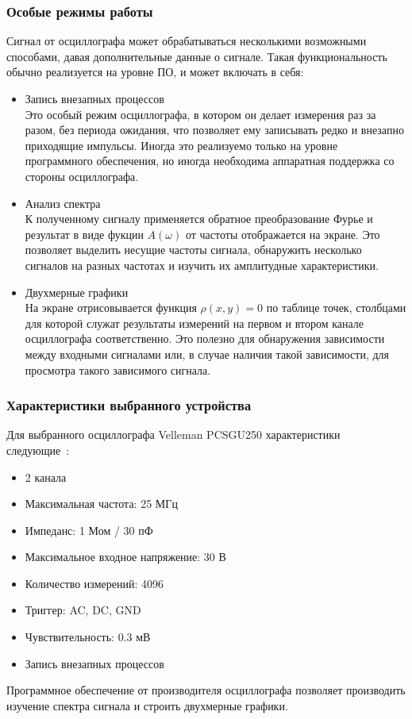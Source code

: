 \documentclass[a4paper,12pt]{report}
\numberwithin{equation}{section}
\begin{document}
\subsubsection{Особые режимы работы}
Сигнал от осциллографа может обрабатываться несколькими возможными способами,
давая дополнительные данные о сигнале. Такая функциональность обычно реализуется
на уровне ПО, и может включать в себя:
\begin{itemize}
\item Запись внезапных процессов \\
Это особый режим осциллографа, в котором он делает измерения раз за разом, без
периода ожидания, что позволяет ему записывать редко и внезапно приходящие
импульсы. Иногда это реализуемо только на уровне программного обеспечения, но
иногда необходима аппаратная поддержка со стороны осциллографа.
\item Анализ спектра \\
К полученному сигналу применяется обратное преобразование Фурье и результат
в виде фукции $A(\omega)$ от частоты отображается на экране. Это позволяет
выделить несущие частоты сигнала, обнаружить несколько сигналов на разных
частотах и изучить их амплитудные характеристики.
\item Двухмерные графики \\
На экране отрисовывается функция $\rho(x, y)=0$ по таблице точек, столбцами для
которой служат результаты измерений на первом и втором канале осциллографа
соответственно. Это полезно для обнаружения зависимости между входными сигналами
или, в случае наличия такой зависимости, для просмотра такого зависимого
сигнала.
\end{itemize}

\subsubsection{Характеристики выбранного устройства}
Для выбранного осциллографа Velleman PCSGU250 характеристики
следующие~\cite{vellemaninfo}:
\begin{itemize}
\item 2 канала
\item Максимальная частота: 25 МГц
\item Импеданс: 1 Мом / 30 пФ
\item Максимальное входное напряжение: 30 В
\item Количество измерений: 4096
\item Триггер: AC, DC, GND
\item Чувствительность: 0.3 мВ
\item Запись внезапных процессов
\end{itemize}
Программное обеспечение от производителя осциллографа позволяет производить
изучение спектра сигнала и строить двухмерные графики.
\end{document}
